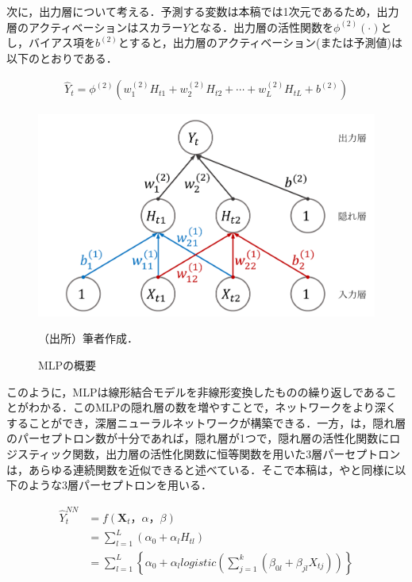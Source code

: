 \documentclass[a4paper，11pt]{jsarticle}
\begin{document}
 次に，出力層について考える．予測する変数は本稿では1次元であるため，出力層のアクティベーションはスカラー$Y$となる．出力層の活性関数を$\phi^{(2)}(\cdot)$とし，バイアス項を$b^{(2)}$とすると，出力層のアクティベーション(または予測値)は以下のとおりである．

\begin{equation}
  \begin{split}
    \hat{Y}_t = \phi^{(2)} \left( w^{(2)}_{1} H_{t1} + w^{(2)}_{2} H_{t2} + \cdots + w^{(2)}_{L} H_{tL} + b^{(2)} \right)
  \end{split}
\end{equation}

\begin{figure}[tbp]
  \centering
  \caption{MLPの概要}
  \label{fig:mlp}
  \includegraphics[width=0.6\linewidth]{./img/_ann_mlp_colored.pdf}
  \begin{threeparttable}
  \begin{tablenotes}
    \item[]（出所）筆者作成．
  \end{tablenotes}
  \end{threeparttable}
\end{figure}

このように，MLPは線形結合モデルを非線形変換したものの繰り返しであることがわかる．このMLPの隠れ層の数を増やすことで，ネットワークをより深くすることができ，深層ニューラルネットワークが構築できる．一方，\cite{qi1999nonlinear}は，隠れ層のパーセプトロン数が十分であれば，隠れ層が1つで，隠れ層の活性化関数にロジスティック関数，出力層の活性化関数に恒等関数を用いた3層パーセプトロンは，あらゆる連続関数を近似できると述べている．そこで本稿は，\cite{callen1996neural}や\cite{zhang2004neural}と同様に以下のような3層パーセプトロンを用いる．

\begin{equation}
  \begin{split}
    \hat{Y}_t^{NN} 
    &= f({\bm{X}_t，\alpha，\beta}) \\
    &= \sum^{L}_{l=1} \left(\alpha_0 + \alpha_l H_{tl} \right) \\
    &= \sum^{L}_{l=1} \left\{ \alpha_0 + \alpha_l \textit{logistic} \left(\sum^{k}_{j=1} \left(\beta_{0l} + \beta_{jl} X_{tj} \right) \right) \right\} \\
  \end{split}
\end{equation}
\end{document}
